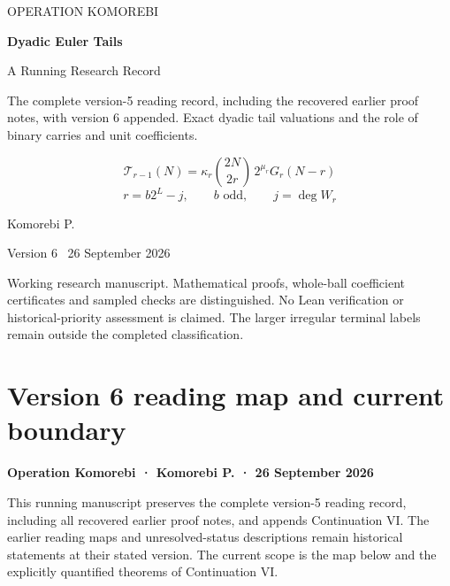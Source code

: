 \documentclass[11pt,letterpaper]{article}
\begin{document}
\hypersetup{pageanchor=false}
\begin{titlepage}
\thispagestyle{empty}
\vspace*{0.65in}
{\sffamily\large OPERATION KOMOREBI\par}
\vspace{0.55in}
{\sffamily\fontsize{31}{36}\selectfont\bfseries Dyadic Euler Tails\par}
\vspace{0.20in}
{\sffamily\fontsize{20}{25}\selectfont A Running Research Record\par}
\vspace{0.38in}
{\large The complete version-5 reading record, including the recovered earlier proof notes, with version 6 appended. Exact dyadic tail valuations and the role of binary carries and unit coefficients.\par}
\vspace{0.45in}
\[
\mathcal T_{r-1}(N)=\kappa_r\binom{2N}{2r}\,2^{\mu_r}G_r(N-r)
\]
\[
r=b2^L-j,\qquad b\text{ odd},\qquad j=\deg W_r
\]
\vfill
{\large Komorebi P.\par}
\vspace{0.14in}
{\sffamily Version 6 \textbar\ 26 September 2026\par}
\vspace{0.35in}
\begin{minipage}{0.94\textwidth}
\small
Working research manuscript. Mathematical proofs, whole-ball coefficient certificates and sampled checks are distinguished. No Lean verification or historical-priority assessment is claimed. The larger irregular terminal labels remain outside the completed classification.
\end{minipage}
\end{titlepage}
\hypersetup{pageanchor=true}
\tableofcontents
\clearpage
{}
\section{Version 6 reading map and current boundary}\label{version-6-reading-map-and-current-boundary}

\textbf{Operation Komorebi · Komorebi P. · 26 September 2026}

This running manuscript preserves the complete version-5 reading record, including all recovered earlier proof notes, and appends Continuation VI. The earlier reading maps and unresolved-status descriptions remain historical statements at their stated version. The current scope is the map below and the explicitly quantified theorems of Continuation VI.
\end{document}
